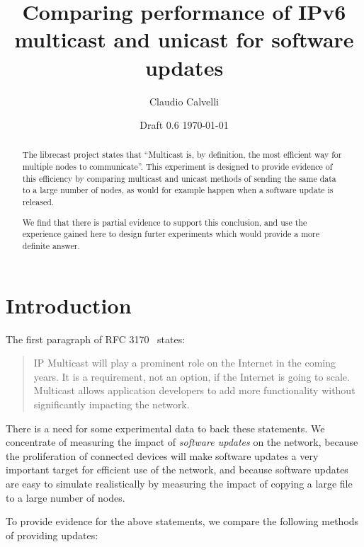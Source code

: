 \documentclass[a4paper,11pt,twocolumn]{article}
\title{Comparing performance of IPv6 multicast and unicast for software updates}
\author{Claudio Calvelli}
\date{Draft 0.6 \today}
\begin{document}
\maketitle

\begin{abstract}
The librecast project states that ``Multicast is, by definition, the most
efficient way for multiple nodes to communicate''.  This experiment is
designed to provide evidence of this efficiency by comparing multicast
and unicast methods of sending the same data to a large number of nodes,
as would for example happen when a software update is released.

We find that there is partial evidence to support this conclusion,
and use the experience gained here to design furter experiments which
would provide a more definite answer.
\end{abstract}

\section{Introduction}
The first paragraph of RFC 3170~\cite{rfc:3170} states:

\begin{quotation}
\noindent
IP Multicast will play a prominent role on the Internet in the coming
years.  It is a requirement, not an option, if the Internet is going
to scale.  Multicast allows application developers to add more
functionality without significantly impacting the network.
\end{quotation}

There is a need for some experimental data to back these statements.
We concentrate of measuring the impact of {\it software
updates\/} on the network, because the proliferation of connected
devices will make software updates a very important target for
efficient use of the network, and because software updates are
easy to simulate realistically by measuring the impact of copying
a large file to a large number of nodes.

To provide evidence for the above statements, we compare the
following methods of providing updates:
\end{document}
